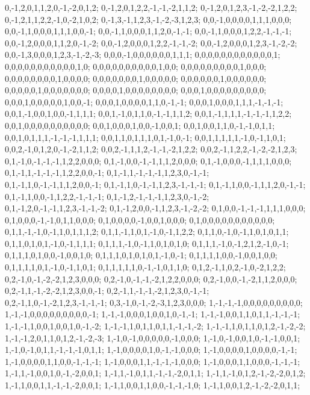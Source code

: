 {{0,-1,2,0,1,1,2,0,-1,-2,0,1,2; 0,-1,2,0,1,2,2,-1,-1,-2,1,1,2; 0,-1,2,0,1,2,3,-1,-2,-2,1,2,2; 0,-1,2,1,1,2,2,-1,0,-2,1,0,2; 0,-1,3,-1,1,2,3,-1,-2,-3,1,2,3; 0,0,-1,0,0,0,0,1,1,1,0,0,0; 0,0,-1,1,0,0,0,1,1,1,0,0,-1; 0,0,-1,1,0,0,0,1,1,2,0,-1,-1; 0,0,-1,1,0,0,0,1,2,2,-1,-1,-1; 0,0,-1,2,0,0,0,1,1,2,0,-1,-2; 0,0,-1,2,0,0,0,1,2,2,-1,-1,-2; 0,0,-1,2,0,0,0,1,2,3,-1,-2,-2;
0,0,-1,3,0,0,0,1,2,3,-1,-2,-3; 0,0,0,-1,0,0,0,0,0,0,1,1,1; 0,0,0,0,0,0,0,0,0,0,0,0,1; 0,0,0,0,0,0,0,0,0,0,0,1,0; 0,0,0,0,0,0,0,0,0,0,1,0,0; 0,0,0,0,0,0,0,0,0,1,0,0,0; 0,0,0,0,0,0,0,0,1,0,0,0,0; 0,0,0,0,0,0,0,1,0,0,0,0,0; 0,0,0,0,0,0,1,0,0,0,0,0,0; 0,0,0,0,0,1,0,0,0,0,0,0,0; 0,0,0,0,1,0,0,0,0,0,0,0,0; 0,0,0,1,0,0,0,0,0,0,0,0,0;
0,0,0,1,0,0,0,0,0,1,0,0,-1; 0,0,0,1,0,0,0,0,1,1,0,-1,-1; 0,0,0,1,0,0,0,1,1,1,-1,-1,-1; 0,0,1,-1,0,0,1,0,0,-1,1,1,1; 0,0,1,-1,0,1,1,0,-1,-1,1,1,2; 0,0,1,-1,1,1,1,-1,-1,-1,1,2,2; 0,0,1,0,0,0,0,0,0,0,0,0,0; 0,0,1,0,0,0,1,0,0,-1,0,0,1; 0,0,1,0,0,1,1,0,-1,-1,0,1,1; 0,0,1,0,1,1,1,-1,-1,-1,1,1,1; 0,0,1,1,0,1,1,1,0,1,-1,0,-1; 0,0,1,1,1,1,1,-1,0,-1,1,0,1;
0,0,2,-1,0,1,2,0,-1,-2,1,1,2; 0,0,2,-1,1,1,2,-1,-1,-2,1,2,2; 0,0,2,-1,1,2,2,-1,-2,-2,1,2,3; 0,1,-1,0,-1,-1,-1,1,2,2,0,0,0; 0,1,-1,0,0,-1,-1,1,1,2,0,0,0; 0,1,-1,0,0,0,-1,1,1,1,0,0,0; 0,1,-1,1,-1,-1,-1,1,2,2,0,0,-1; 0,1,-1,1,-1,-1,-1,1,2,3,0,-1,-1; 0,1,-1,1,0,-1,-1,1,1,2,0,0,-1; 0,1,-1,1,0,-1,-1,1,2,3,-1,-1,-1; 0,1,-1,1,0,0,-1,1,1,2,0,-1,-1; 0,1,-1,1,0,0,-1,1,2,2,-1,-1,-1;
0,1,-1,2,-1,-1,-1,1,2,3,0,-1,-2; 0,1,-1,2,0,-1,-1,1,2,3,-1,-1,-2; 0,1,-1,2,0,0,-1,1,2,3,-1,-2,-2; 0,1,0,0,-1,-1,-1,1,1,1,0,0,0; 0,1,0,0,0,-1,-1,0,1,1,0,0,0; 0,1,0,0,0,0,-1,0,0,1,0,0,0; 0,1,0,0,0,0,0,0,0,0,0,0,0; 0,1,1,-1,-1,0,-1,1,0,1,1,1,2; 0,1,1,-1,1,0,1,-1,0,-1,1,2,2; 0,1,1,0,-1,0,-1,1,0,1,0,1,1; 0,1,1,0,1,0,1,-1,0,-1,1,1,1; 0,1,1,1,-1,0,-1,1,0,1,0,1,0;
0,1,1,1,-1,0,-1,2,1,2,-1,0,-1; 0,1,1,1,0,1,0,0,-1,0,0,1,0; 0,1,1,1,0,1,0,1,0,1,-1,0,-1; 0,1,1,1,1,0,0,-1,0,0,1,0,0; 0,1,1,1,1,0,1,-1,0,-1,1,0,1; 0,1,1,1,1,1,0,-1,-1,0,1,1,0; 0,1,2,-1,1,0,2,-1,0,-2,1,2,2; 0,2,-1,0,-1,-2,-2,1,2,3,0,0,0; 0,2,-1,0,-1,-1,-2,1,2,2,0,0,0; 0,2,-1,0,0,-1,-2,1,1,2,0,0,0; 0,2,-1,1,-1,-2,-2,1,2,3,0,0,-1; 0,2,-1,1,-1,-1,-2,1,2,3,0,-1,-1;
0,2,-1,1,0,-1,-2,1,2,3,-1,-1,-1; 0,3,-1,0,-1,-2,-3,1,2,3,0,0,0; 1,-1,-1,-1,0,0,0,0,0,0,0,0,0; 1,-1,-1,0,0,0,0,0,0,0,0,0,-1; 1,-1,-1,0,0,0,1,0,0,1,0,-1,-1; 1,-1,-1,0,0,1,1,0,1,1,-1,-1,-1; 1,-1,-1,1,0,0,1,0,0,1,0,-1,-2; 1,-1,-1,1,0,1,1,0,1,1,-1,-1,-2; 1,-1,-1,1,0,1,1,0,1,2,-1,-2,-2; 1,-1,-1,2,0,1,1,0,1,2,-1,-2,-3; 1,-1,0,-1,0,0,0,0,0,-1,0,0,0; 1,-1,0,-1,0,0,1,0,-1,-1,0,0,1;
1,-1,0,-1,0,1,1,-1,-1,-1,0,1,1; 1,-1,0,0,0,0,1,0,-1,-1,0,0,0; 1,-1,0,0,0,0,1,0,0,0,0,-1,-1; 1,-1,0,0,0,0,1,1,0,0,-1,-1,-1; 1,-1,0,0,0,1,1,-1,-1,-1,0,0,0; 1,-1,0,0,0,1,1,0,0,0,-1,-1,-1; 1,-1,1,-1,0,0,1,0,-1,-2,0,0,1; 1,-1,1,-1,0,1,1,-1,-1,-2,0,1,1; 1,-1,1,-1,0,1,2,-1,-2,-2,0,1,2; 1,-1,1,0,0,1,1,-1,-1,-2,0,0,1; 1,-1,1,0,0,1,1,0,0,-1,-1,-1,0; 1,-1,1,0,0,1,2,-1,-2,-2,0,1,1;
}}
